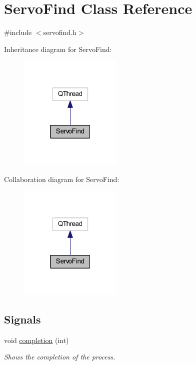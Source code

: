 \hypertarget{a00008}{}\section{Servo\+Find Class Reference}
\label{a00008}


{\ttfamily \#include $<$servofind.\+h$>$}



Inheritance diagram for Servo\+Find\+:
\nopagebreak
\begin{figure}[H]
\begin{center}
\leavevmode
\includegraphics[width=139pt]{db/d3a/a00040}
\end{center}
\end{figure}


Collaboration diagram for Servo\+Find\+:
\nopagebreak
\begin{figure}[H]
\begin{center}
\leavevmode
\includegraphics[width=139pt]{dd/d32/a00041}
\end{center}
\end{figure}
\subsection*{Signals}
\begin{DoxyCompactItemize}
\item 
void \hyperlink{a00008_a8ae9f951508e8376c3c7421df37ea619}{completion} (int)
\begin{DoxyCompactList}\small\item\em Shows the completion of the process. \end{DoxyCompactList}\end{DoxyCompactItemize}
